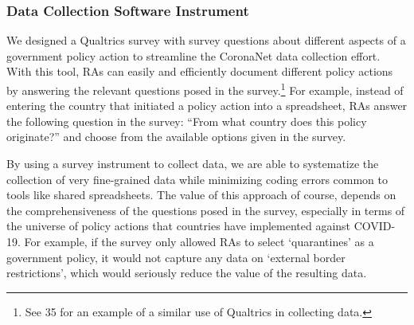 \documentclass[
]{article}
\begin{document}
\hypertarget{data-collection-software-instrument}{%
\subsubsection*{Data Collection Software Instrument}\label{data-collection-software-instrument}}

We designed a Qualtrics survey with survey questions about different aspects of a government policy action to streamline the CoronaNet data collection effort. With this tool, RAs can easily and efficiently document different policy actions by answering the relevant questions posed in the survey.\footnote{See 35 for an example of a similar use of Qualtrics in collecting data.} For example, instead of entering the country that initiated a policy action into a spreadsheet, RAs answer the following question in the survey: ``From what country does this policy originate?'' and choose from the available options given in the survey.

By using a survey instrument to collect data, we are able to systematize the collection of very fine-grained data while minimizing coding errors common to tools like shared spreadsheets. The value of this approach of course, depends on the comprehensiveness of the questions posed in the survey, especially in terms of the universe of policy actions that countries have implemented against COVID-19. For example, if the survey only allowed RAs to select `quarantines' as a government policy, it would not capture any data on `external border restrictions', which would seriously reduce the value of the resulting data.
\end{document}
